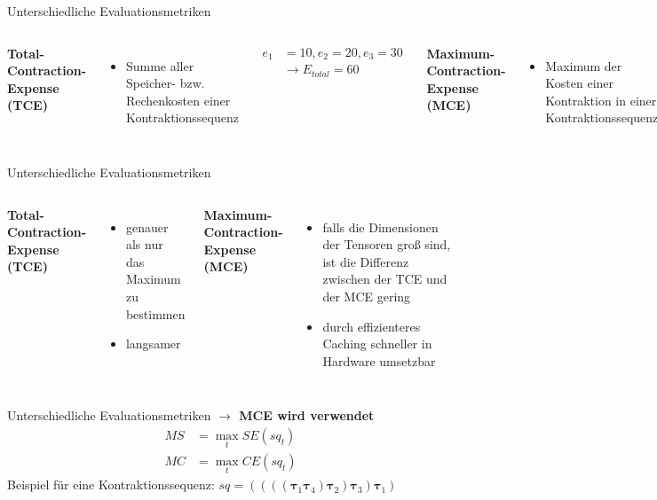 \documentclass{beamer}
\newcommand{\tauB}{\bm{\tau}}
\begin{document}
\begin{frame}{Unterschiedliche Evaluationsmetriken}
	\begin{columns}[]

		\textbf{Total-Contraction-Expense (TCE)}
		\begin{itemize}
			\item Summe aller Speicher- bzw. Rechenkosten einer Kontraktionssequenz
		\end{itemize}
		\begin{align*}
			e_1 & = 10, e_2 = 20, e_3 = 30   \\
			    & \rightarrow E_{total} = 60
		\end{align*}


		\textbf{Maximum-Contraction-Expense (MCE)}
		\begin{itemize}
			\item Maximum der Kosten einer Kontraktion in einer Kontraktionssequenz
		\end{itemize}
		\begin{align*}
			e_1 & = 10, e_2 = 20, e_3 = 30 \\
			    & \rightarrow E_{max} = 30
		\end{align*}
	\end{columns}
\end{frame}

\begin{frame}{Unterschiedliche Evaluationsmetriken}
	\begin{columns}
		\textbf{Total-Contraction-Expense (TCE)}
		\begin{itemize}
			\item genauer als nur das Maximum zu bestimmen
			\item langsamer
		\end{itemize}


		\textbf{Maximum-Contraction-Expense (MCE)}
		\begin{itemize}
			\item falls die Dimensionen der Tensoren groß sind, ist die Differenz zwischen der TCE und der MCE gering
			\item durch effizienteres Caching schneller in Hardware umsetzbar
		\end{itemize}

	\end{columns}
\end{frame}

\begin{frame}{Unterschiedliche Evaluationsmetriken}
	\textbf{$\rightarrow$ MCE wird verwendet}
	\begin{align*}
		MS & = \max_t SE(sq_t) \\ MC &= \max_t CE(sq_t)
	\end{align*}
	Beispiel für eine Kontraktionssequenz:
	$sq = ((((\tauB_{1} \tauB_{4}) \tauB_{2}) \tauB_{3}) \tauB_{1})$
\end{frame}
\end{document}
